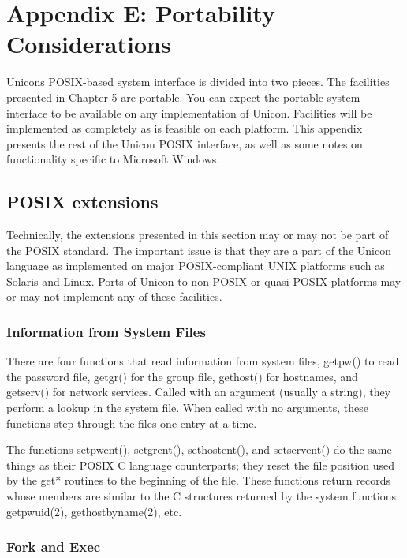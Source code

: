 \clearpage\section{Appendix E: Portability Considerations}

Unicon{\textquotesingle}s POSIX-based system interface is divided into
two pieces. The facilities presented in Chapter 5 are portable. You can
expect the portable system interface to be available on any
implementation of Unicon. Facilities will be implemented as completely
as is feasible on each platform. This appendix presents the rest of the
Unicon POSIX interface, as well as some notes on functionality specific
to Microsoft Windows.

\subsection[POSIX extensions]{POSIX extensions}

Technically, the extensions presented in this
section may or may not be part of the POSIX standard. The important
issue is that they are a part of the Unicon language as implemented on
major POSIX-compliant UNIX platforms such as Solaris and Linux. Ports
of Unicon to non-POSIX or quasi-POSIX platforms may or may not
implement any of these facilities.

\subsubsection{Information from System Files}

There are four functions that read information from system files,
getpw() to read the password file, getgr() for the group file,
gethost() for hostnames, and getserv() for network services. Called
with an argument (usually a string), they perform a lookup in the
system file. When called with no arguments, these functions step
through the files one entry at a time.

The functions setpwent(), setgrent(), sethostent(), and setservent() do
the same things as their POSIX C language counterparts; they reset the
file position used by the get* routines to the beginning of the file.
These functions return records whose members are similar to the C
structures returned by the system functions getpwuid(2),
gethostbyname(2), etc.

\subsubsection{Fork and Exec}

